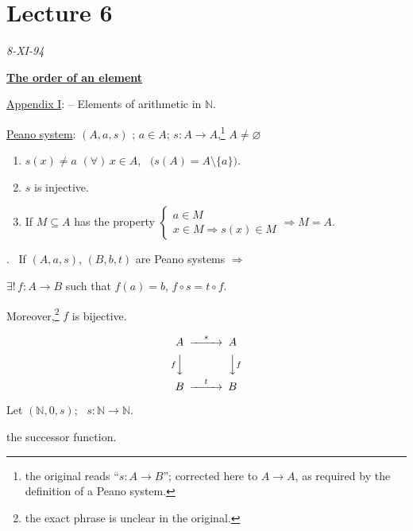 \bigskip

\section{Lecture 6}


\begin{center}
\end{center}
\begin{flushright}
\textit{8-XI-94}
\end{flushright}

\bigskip
\noindent\underline{\textbf{The order of an element}}

\bigskip
\noindent\underline{Appendix I}: -- Elements of arithmetic in $\mathbb{N}$.

\bigskip
\noindent\underline{Peano system}: $(A,a,s)$ ; $a\in A$; $s:A\to A$,\footnote{the original reads ``$s:A\to B$''; corrected here to $A\to A$, as required by the definition of a Peano system.} $A\neq\varnothing$

\begin{enumerate}
\item[1)] $s(x)\neq a$ $(\forall)\,x\in A$, \ $\big(s(A)=A\setminus\{a\}\big)$.
\item[2)] $s$ is injective.
\item[3)] If $M\subseteq A$ has the property $\begin{cases} a\in M \\ x\in M \Rightarrow s(x)\in M \end{cases} \Rightarrow M=A$.
\end{enumerate}

\bigskip
\noindent{}. \ If $(A,a,s)$, $(B,b,t)$ are Peano systems $\Rightarrow$

\noindent $\exists!\, f:A\to B$ such that $f(a)=b$, $f\circ s = t\circ f$.

\noindent Moreover,\footnote{the exact phrase is unclear in the original.} $f$ is bijective.

\[
\begin{CD}
A @>s>> A\\
@VfVV @VVfV\\
B @>t>> B
\end{CD}
\]

\bigskip
\noindent Let $(\mathbb{N},0,s)$; \ $s:\mathbb{N}\to\mathbb{N}$.

\noindent the successor function.

